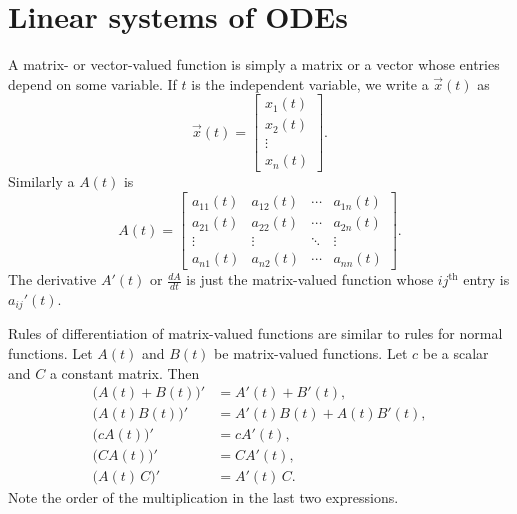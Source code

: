 
\sectionnewpage
\section{Linear systems of ODEs}
\label{linsystems:section}


A matrix- or vector-valued function is
simply a matrix or a vector whose entries depend on some variable.
If $t$ is the independent variable, we write a
\emph{}
$\vec{x}(t)$ as
\begin{equation*}
\vec{x}(t) = \begin{bmatrix}
x_1(t) \\
x_2(t) \\
\vdots \\
x_n(t)
\end{bmatrix} .
\end{equation*}
Similarly a \emph{} $A(t)$ is
\begin{equation*}
A(t) =
\begin{bmatrix}
a_{11}(t) & a_{12}(t) & \cdots & a_{1n}(t) \\
a_{21}(t) & a_{22}(t) & \cdots & a_{2n}(t) \\
\vdots & \vdots & \ddots & \vdots \\
a_{n1}(t) & a_{n2}(t) & \cdots & a_{nn}(t)
\end{bmatrix} .
\end{equation*}
The derivative $A'(t)$ or $\frac{dA}{dt}$ is
just the matrix-valued function
whose $ij^{\text{th}}$ entry is $a_{ij}'(t)$.

Rules of differentiation of matrix-valued functions
are similar to rules for normal
functions.  Let $A(t)$ and $B(t)$ be matrix-valued
functions.  Let $c$ be a scalar and $C$ a constant matrix.
Then
\begin{equation*}
\begin{aligned}
\bigl(A(t)+B(t)\bigr)' & = A'(t) + B'(t), \\
\bigl(A(t)B(t)\bigr)' & = A'(t)B(t) + A(t)B'(t), \\
\bigl(cA(t)\bigr)' & = cA'(t), \\
\bigl(CA(t)\bigr)' & = CA'(t), \\
\bigl(A(t)\,C\bigr)' & = A'(t)\,C .
\end{aligned}
\end{equation*}
Note the order of the multiplication in the last two expressions.

